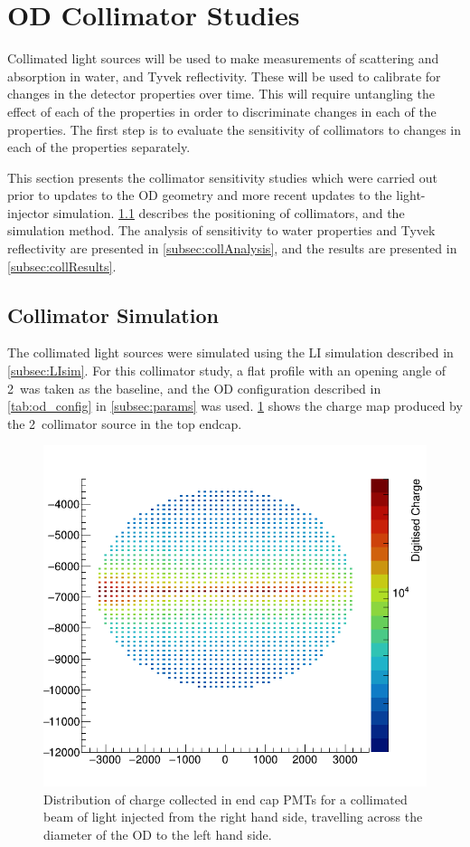 \documentclass[a4paper,11pt]{article}
\begin{document}
\section{OD Collimator Studies}\label{sec:collimator_studies}

Collimated light sources will be used to make measurements of scattering and absorption in water, and Tyvek reflectivity. These will be used to calibrate for changes in the detector properties over time. This will require untangling the effect of each of the properties in order to discriminate changes in each of the properties. The first step is to evaluate the sensitivity of collimators to changes in each of the properties separately. 

This section presents the collimator sensitivity studies which were carried out prior to updates to the OD geometry and more recent updates to the light-injector simulation. \cref{subsec:collSim} describes the positioning of collimators, and the simulation method. The analysis of sensitivity to water properties and Tyvek reflectivity are presented in \cref{subsec:collAnalysis}, and the results are presented in \cref{subsec:collResults}.

\subsection{Collimator Simulation}\label{subsec:collSim}

The collimated light sources were simulated using the LI simulation described in \cref{subsec:LIsim}. For this collimator study, a flat profile with an opening angle of 2\textdegree~was taken as the baseline, and the OD configuration described in \cref{tab:od_config} in \cref{subsec:params} was used. \cref{fig:collMap} shows the charge map produced by the 2\textdegree~collimator source in the top endcap.

 \begin{figure}[ht!]
     \centering
     \includegraphics[width=0.5\linewidth]{hitmapColl.png}
     \caption{Distribution of charge collected in end cap PMTs for a collimated
beam of light injected from the right hand side, travelling across the diameter of the OD to the left hand side.}
     \label{fig:collMap}
 \end{figure}
\end{document}

